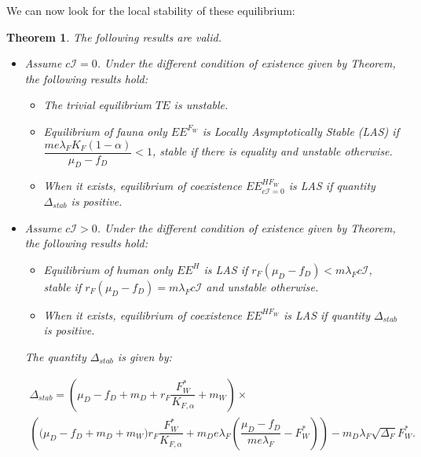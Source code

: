 \documentclass{article}
\newcommand{\lfw}{\lambda_{F}}
\newcommand{\lfw}{\lambda_{F}}
\newtheorem{theorem}{Theorem}
\begin{document}
We can now look for the local stability of these equilibrium:

\begin{theorem}\label{TheoremLAS} The following results are valid.
\begin{itemize}
\item Assume $c\mathcal{I} = 0$. Under the different condition of existence given by Theorem, the following results hold:
\begin{itemize}
\item The trivial equilibrium $TE$ is unstable.
\item Equilibrium of fauna only $EE^{F_W}$ is Locally Asymptotically Stable (LAS) if $\dfrac{m e \lfw K_F(1-\alpha)}{\mu_D - f_D} < 1 $, stable if there is equality and unstable otherwise.
\item When it exists, equilibrium of coexistence $EE^{HF_W}_{c\mathcal{I} =0}$ is LAS if quantity $\Delta_{stab}$ is positive.
\end{itemize}

\item Assume $c\mathcal{I} > 0$. Under the different condition of existence given by Theorem, the following results hold:
\begin{itemize}
\item Equilibrium of human only $EE^{H}$ is LAS if $r_F(\mu_D - f_D) < m \lfw c\mathcal{I}$, stable if $r_F(\mu_D - f_D) = m \lfw c\mathcal{I}$ and unstable otherwise.
\item When it exists, equilibrium of coexistence $EE^{HF_W}$ is LAS if quantity $\Delta_{stab}$ is positive.
\end{itemize}
The quantity $\Delta_{stab}$ is given by:

\begin{multline*}
\Delta_{stab} = \left(\mu_D -f_D + m_D + r_F \dfrac{F_W^*}{K_{F, \alpha}} + m_W\right) \times \\
\left(\big( \mu_D -f_D + m_D + m_W) r_F \dfrac{F^*_W}{K_{F, \alpha}}   + m_D e\lfw   \left(\dfrac{\mu_D - f_D}{m e\lfw} - F^*_W \right)\right) - m_D \lfw \sqrt{\Delta_F}  F^*_{W}.
\end{multline*}
\end{itemize}
\end{theorem}
\end{document}
